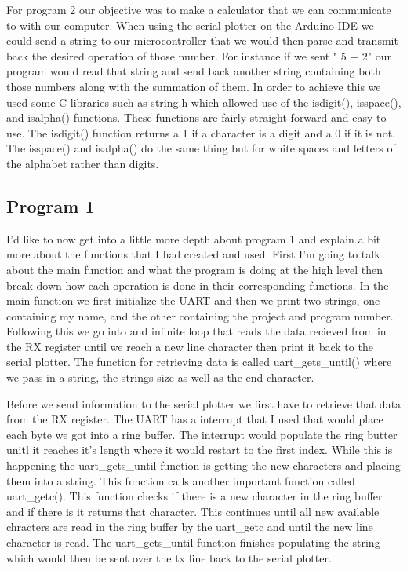 \documentclass[11pt,pdftex,portrait,letterpaper]{article}
\begin{document}
	For program 2 our objective was to make a calculator that we can communicate to with our computer. When using the serial plotter on the Arduino IDE we could send a string to our microcontroller that we would then parse and transmit back the desired operation of those number. For instance if we sent " 5 + 2" our program would read that string and send back another string containing both those numbers along with the summation of them. In order to achieve this we used some C libraries such as string.h which allowed use of the isdigit(), isspace(), and isalpha() functions. These functions are fairly straight forward and easy to use. The isdigit() function returns a 1 if a character is a digit and a 0 if it is not. The isspace() and isalpha() do the same thing but for white spaces and letters of the alphabet rather than digits.
	
	
	\subsection{Program 1}
	
	I'd like to now get into a little more depth about program 1 and explain a bit more about the functions that I had created and used. First I'm going to talk about the main function and what the program is doing at the high level then break down how each operation is done in their corresponding functions. In the main function we first initialize the UART and then we print two strings, one containing my name, and the other containing the project and program number. Following this we go into and infinite loop that reads the data recieved from in the RX register until we reach a new line character then print it back to the serial plotter. The function for retrieving data is called uart\_gets\_until() where we pass in a string, the strings size as well as the end character.
	
	Before we send information to the serial plotter we first have to retrieve that data from the RX register. The UART has a interrupt that I used that would place each byte we got into a ring buffer. The interrupt would populate the ring butter unitl it reaches it's length where it would restart to the first index. While this is happening the uart\_gets\_until function is getting the new characters and placing them into a string. This function calls another important function called uart\_getc(). This function checks if there is a new character in the ring buffer and if there is it returns that character. This continues until all new available chracters are read in the ring buffer by the uart\_getc and until the new line character is read. The uart\_gets\_until function finishes populating the string which would then be sent over the tx line back to the serial plotter.
\end{document}
